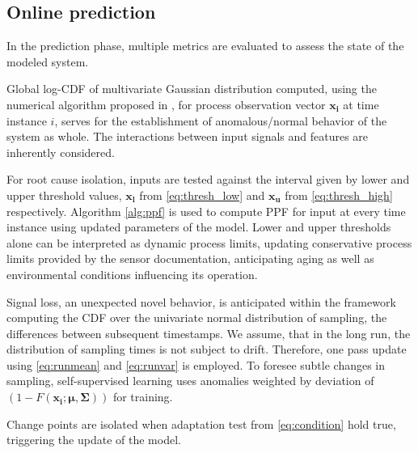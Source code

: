 \subsection{Online prediction}\label{predict}
In the prediction phase, multiple metrics are evaluated to assess the state of the modeled system. 

Global log-CDF of multivariate Gaussian distribution computed, using the numerical algorithm proposed in \cite{Genz2000}, for process observation vector $\boldsymbol{x_i}$ at time instance $i$, serves for the establishment of anomalous/normal behavior of the system as whole. The interactions between input signals and features are inherently considered. 

For root cause isolation, inputs are tested against the interval given by lower and upper threshold values, $\boldsymbol{x_l}$ from \eqref{eq:thresh_low} and $\boldsymbol{x_u}$ from \eqref{eq:thresh_high} respectively. Algorithm \ref{alg:ppf} is used to compute PPF for input at every time instance using updated parameters of the model. Lower and upper thresholds alone can be interpreted as dynamic process limits, updating conservative process limits provided by the sensor documentation, anticipating aging as well as environmental conditions influencing its operation.

Signal loss, an unexpected novel behavior, is anticipated within the framework computing the CDF over the univariate normal distribution of sampling, the differences between subsequent timestamps. We assume, that in the long run, the distribution of sampling times is not subject to drift. Therefore, one pass update using \eqref{eq:runmean} and \eqref{eq:runvar} is employed. To foresee subtle changes in sampling, self-supervised learning uses anomalies weighted by deviation of $(1 - F(\boldsymbol{x_i}; \boldsymbol{\mu}, \boldsymbol{\Sigma}))$ for training.

Change points are isolated when adaptation test from \eqref{eq:condition} hold true, triggering the update of the model.

